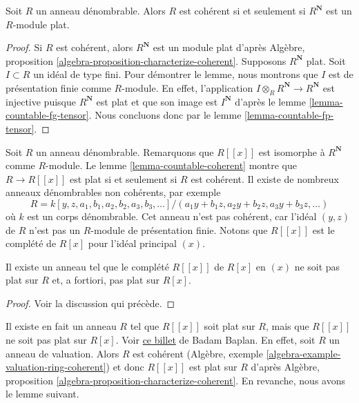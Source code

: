 \begin{lemma}
\label{lemma-countable-coherent}
Soit $R$ un anneau dénombrable. Alors $R$ est cohérent si et seulement si
$R^\mathbf{N}$ est un $R$-module plat.
\end{lemma}

\begin{proof}
Si $R$ est cohérent, alors $R^\mathbf{N}$ est un module plat d'après
Algèbre, proposition \ref{algebra-proposition-characterize-coherent}.
Supposons $R^\mathbf{N}$ plat. Soit $I \subset R$ un idéal de type
fini. Pour démontrer le lemme, nous montrons que $I$ est de
présentation finie comme $R$-module. En effet, l'application
$I \otimes_R R^\mathbf{N} \to R^\mathbf{N}$ est
injective puisque $R^\mathbf{N}$ est plat et que son image est
$I^\mathbf{N}$ d'après le lemme \ref{lemma-countable-fg-tensor}.
Nous concluons donc par le lemme \ref{lemma-countable-fp-tensor}.
\end{proof}

\noindent
Soit $R$ un anneau dénombrable. Remarquons que $R[[x]]$ est isomorphe à
$R^\mathbf{N}$ comme $R$-module. Le lemme \ref{lemma-countable-coherent}
montre que $R \to R[[x]]$ est plat si et seulement si $R$ est cohérent.
Il existe de nombreux anneaux dénombrables non cohérents, par exemple
$$
R = k[y, z, a_1, b_1, a_2, b_2, a_3, b_3, \ldots]/
(a_1 y + b_1 z, a_2 y + b_2 z, a_3 y + b_3 z, \ldots)
$$
où $k$ est un corps dénombrable. Cet anneau n'est pas cohérent, car
l'idéal $(y, z)$ de $R$ n'est pas un $R$-module de présentation finie.
Notons que $R[[x]]$ est le complété de $R[x]$ pour l'idéal
principal $(x)$.

\begin{lemma}
\label{lemma-completion-polynomial-ring-not-flat}
Il existe un anneau tel que le complété $R[[x]]$ de $R[x]$
en $(x)$ ne soit pas plat sur $R$ et, a fortiori, pas plat sur $R[x]$.
\end{lemma}

\begin{proof}
Voir la discussion qui précède.
\end{proof}

\noindent
Il existe en fait un anneau $R$ tel que $R[[x]]$ soit plat
sur $R$, mais que $R[[x]]$ ne soit pas plat sur $R[x]$. Voir
\href{https://math.stackexchange.com/users/164860/badam-baplan}{ce billet}
de Badam Baplan. En effet, soit
$R$ un anneau de valuation. Alors $R$ est cohérent (Algèbre, exemple
\ref{algebra-example-valuation-ring-coherent}) et donc
$R[[x]]$ est plat sur $R$ d'après
Algèbre, proposition \ref{algebra-proposition-characterize-coherent}.
En revanche, nous avons le lemme suivant.


